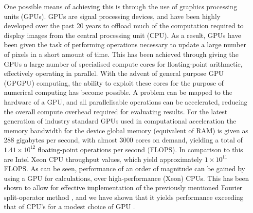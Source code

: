 One possible means of achieving this is through the use of graphics processing units (GPUs). GPUs are signal processing devices, and have been highly developed over the past 20 years to offload much of the computation required to display images from the central processing unit (CPU). As a result, GPUs have been given the task of performing operations necessary to update a large number of pixels in a short amount of time. This has been achieved through giving the GPUs a large number of specialised compute cores for floating-point arithmetic, effectively operating in parallel. With the advent of general purpose GPU (GPGPU) computing, the ability to exploit these cores for the purpose of numerical computing has become possible. A problem can be mapped to the hardware of a GPU, and all parallelisable operations can be accelerated, reducing the overall compute overhead required for evaluating results. For the latest generation of industry standard GPUs used in computational
acceleration the memory bandwidth for the device global memory (equivalent of RAM) is given as 288 gigabytes per second, with almost 3000 cores on demand, yielding a total of $1.41\times10^{12}$ floating-point operations per second (FLOPS). In comparison to this are Intel Xeon CPU throughput values, which yield approximately $1\times10^{11}$ FLOPS. As can be seen, performance of an order of magnitude can be gained by using a GPU for calculations, over high-performance (Xeon) CPUs. This has been shown to allow for effective implementation of the previously mentioned Fourier split-operator method \cite{Num:Bauke_cpc_2011}, and we have shown that it yields performance exceeding that of CPU's for a modest choice of GPU \cite{AO:Morgan_pra_2013}.

